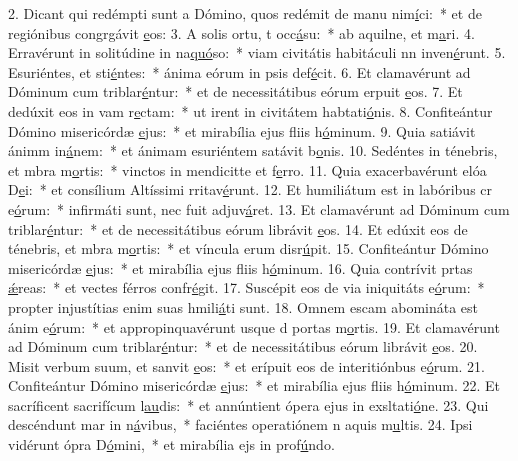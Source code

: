 2. Dicant qui redémpti sunt a Dómino, quos redémit de manu nim\uline{í}ci:~* et de regiónibus congrgávit \uline{e}os:
3. A solis ortu, t occ\uline{á}su:~* ab aquilne, et m\uline{a}ri.
4. Erravérunt in solitúdine in na\uline{quó}so:~* viam civitátis habitáculi nn inven\uline{é}runt.
5. Esuriéntes, et sti\uline{é}ntes:~* ánima eórum in psis def\uline{é}cit.
6. Et clamavérunt ad Dóminum cum triblar\uline{é}ntur:~* et de necessitátibus eórum erpuit \uline{e}os.
7. Et dedúxit eos in vam r\uline{e}ctam:~* ut irent in civitátem habtati\uline{ó}nis.
8. Confiteántur Dómino misericórdæ \uline{e}jus:~* et mirabília ejus fliis h\uline{ó}minum.
9. Quia satiávit ánimm in\uline{á}nem:~* et ánimam esuriéntem satávit b\uline{o}nis.
10. Sedéntes in ténebris, et mbra m\uline{o}rtis:~* vinctos in mendicitte et f\uline{e}rro.
11. Quia exacerbavérunt elóa D\uline{e}i:~* et consílium Altíssimi rritav\uline{é}runt.
12. Et humiliátum est in labóribus cr e\uline{ó}rum:~* infirmáti sunt, nec fuit  adjuv\uline{á}ret.
13. Et clamavérunt ad Dóminum cum triblar\uline{é}ntur:~* et de necessitátibus eórum librávit \uline{e}os.
14. Et edúxit eos de ténebris, et mbra m\uline{o}rtis:~* et víncula erum disr\uline{ú}pit.
15. Confiteántur Dómino misericórdæ \uline{e}jus:~* et mirabília ejus fliis h\uline{ó}minum.
16. Quia contrívit prtas \uline{ǽ}reas:~* et vectes férros confr\uline{é}git.
17. Suscépit eos de via iniquitáts e\uline{ó}rum:~* propter injustítias enim suas hmili\uline{á}ti sunt.
18. Omnem escam abomináta est ánim e\uline{ó}rum:~* et appropinquavérunt usque d portas m\uline{o}rtis.
19. Et clamavérunt ad Dóminum cum triblar\uline{é}ntur:~* et de necessitátibus eórum librávit \uline{e}os.
20. Misit verbum suum, et sanvit \uline{e}os:~* et erípuit eos de interitiónbus e\uline{ó}rum.
21. Confiteántur Dómino misericórdæ \uline{e}jus:~* et mirabília ejus fliis h\uline{ó}minum.
22. Et sacríficent sacrifícum l\uline{au}dis:~* et annúntient ópera ejus in exsltati\uline{ó}ne.
23. Qui descéndunt mar in n\uline{á}vibus,~* faciéntes operatiónem n aquis m\uline{u}ltis.
24. Ipsi vidérunt ópra D\uline{ó}mini,~* et mirabília ejs in prof\uline{ú}ndo.
